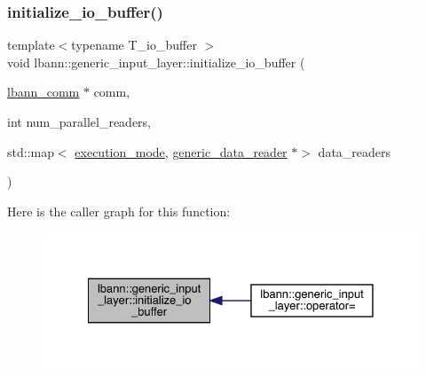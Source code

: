 \subsubsection{\texorpdfstring{initialize\+\_\+io\+\_\+buffer()}{initialize\_io\_buffer()}\hspace{0.1cm}{\footnotesize\ttfamily [1/3]}}
{\footnotesize\ttfamily template$<$typename T\+\_\+io\+\_\+buffer $>$ \\
void lbann\+::generic\+\_\+input\+\_\+layer\+::initialize\+\_\+io\+\_\+buffer (\begin{DoxyParamCaption}\item[{\hyperlink{classlbann_1_1lbann__comm}{lbann\+\_\+comm} $\ast$}]{comm,  }\item[{int}]{num\+\_\+parallel\+\_\+readers,  }\item[{std\+::map$<$ \hyperlink{base_8hpp_a2781a159088df64ed7d47cc91c4dc0a8}{execution\+\_\+mode}, \hyperlink{classlbann_1_1generic__data__reader}{generic\+\_\+data\+\_\+reader} $\ast$$>$}]{data\+\_\+readers }\end{DoxyParamCaption})\hspace{0.3cm}{\ttfamily [inline]}}

Here is the caller graph for this function\+:\nopagebreak
\begin{figure}[H]
\begin{center}
\leavevmode
\includegraphics[width=328pt]{classlbann_1_1generic__input__layer_ab4fa07865c28a35d39ff736075085aba_icgraph}
\end{center}
\end{figure}
\mbox{\label{classlbann_1_1generic__input__layer_ab0afac3b3a3ee9e7af81c0885d233756}} 
